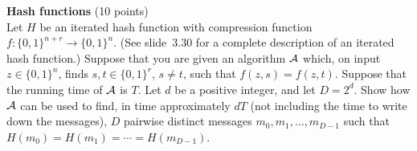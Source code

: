 \begin{problem}{\bf Hash functions} (10 points)\\
Let $H$ be an iterated hash function with compression function
$f : \{0,1\}^{n+r} \rightarrow \{0,1\}^n$. (See slide~3.30 for a complete
description of an iterated hash function.) Suppose that you are
given an algorithm ${\cal A}$ which, on input $z \in \{0,1\}^n$, finds
$s,t \in \{0,1\}^r$, $s \neq t$, such that $f(z,s)=f(z,t)$.
Suppose that the running time of ${\cal A}$ is $T$. Let $d$ be a positive
integer, and let $D=2^d$. Show how ${\cal A}$ can be used to find, in time
approximately $d T$ (not including the time to write down the messages),
$D$ pairwise distinct messages $m_0,m_1,\ldots,m_{D-1}$ such that
$H(m_0)=H(m_1)=\cdots=H(m_{D-1})$.
\end{problem}

\begin{loigiai}
\end{loigiai}
